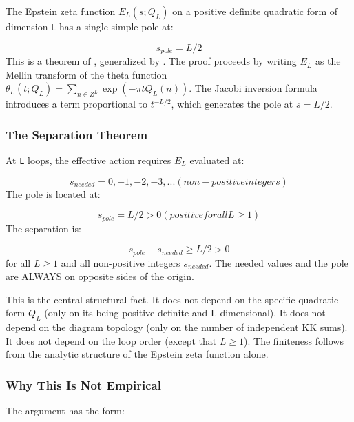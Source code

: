 \documentclass[aps,prd,preprint,superscriptaddress,longbibliography,floatfix]{revtex4-2}
\theoremstyle{remark}
\begin{document}
The Epstein zeta function $E_L(s; Q_L)$ on a positive definite quadratic form of dimension \texttt{L} has a single simple pole at:


\begin{equation}
    s_{pole} = L/2
\end{equation}
This is a theorem of \cite{Epstein1903}, generalized by \cite{Terras1985}. The proof proceeds by writing $E_L$ as the Mellin transform of the theta function $\theta_L(t; Q_L) = \sum_{n \in Z^{L}} \exp(-\pi t Q_L(n))$. The Jacobi inversion formula introduces a term proportional to $t^{-L/2}$, which generates the pole at $s = L/2$.


\subsubsection{The Separation Theorem}

At \texttt{L} loops, the effective action requires $E_L$ evaluated at:


\begin{equation}
    s_{needed} = 0, -1, -2, -3, ...        (non-positive integers)
\end{equation}
The pole is located at:


\begin{equation}
    s_{pole} = L/2 > 0                      (positive for all L \geq 1)
\end{equation}
The separation is:


\begin{equation}
    s_{pole} - s_{needed} \geq L/2 > 0
\end{equation}
for all $L \geq 1$ and all non-positive integers $s_{needed}$. The needed values and the pole are ALWAYS on opposite sides of the origin.

This is the central structural fact. It does not depend on the specific quadratic form $Q_L$ (only on its being positive definite and L-dimensional). It does not depend on the diagram topology (only on the number of independent KK sums). It does not depend on the loop order (except that $L \geq 1$). The finiteness follows from the analytic structure of the Epstein zeta function alone.


\subsubsection{Why This Is Not Empirical}

The argument has the form:
\end{document}

